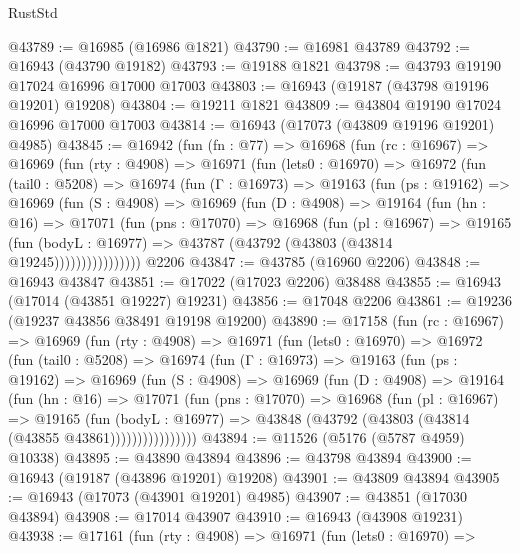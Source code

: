 \begin{lexlean}{RustStd}
\begin{coremodule}
@43789 := @16985 (@16986 @1821)
@43790 := @16981 @43789
@43792 := @16943 (@43790 @19182)
@43793 := @19188 @1821
@43798 := @43793 @19190 @17024 @16996 @17000 @17003
@43803 := @16943 (@19187 (@43798 @19196 @19201) @19208)
@43804 := @19211 @1821
@43809 := @43804 @19190 @17024 @16996 @17000 @17003
@43814 := @16943 (@17073 (@43809 @19196 @19201) @4985)
@43845 := @16942
    (fun (fn : @77) =>
    @16968
      (fun (rc : @16967) =>
      @16969
        (fun (rty : @4908) =>
        @16971
          (fun (lets0 : @16970) =>
          @16972
            (fun (tail0 : @5208) =>
            @16974
              (fun (Γ : @16973) =>
              @19163
                (fun (ps : @19162) =>
                @16969
                  (fun (S : @4908) =>
                  @16969
                    (fun (D : @4908) =>
                    @19164
                      (fun (hn : @16) =>
                      @17071
                        (fun (pns : @17070) =>
                        @16968
                          (fun (pl : @16967) =>
                          @19165
                            (fun (bodyL : @16977) =>
                            @43787 (@43792 (@43803 (@43814 @19245))))))))))))))))
    @2206
@43847 := @43785 (@16960 @2206)
@43848 := @16943 @43847
@43851 := @17022 (@17023 @2206) @38488
@43855 := @16943 (@17014 (@43851 @19227) @19231)
@43856 := @17048 @2206
@43861 := @19236 (@19237 @43856 @38491 @19198 @19200)
@43890 := @17158
    (fun (rc : @16967) =>
    @16969
      (fun (rty : @4908) =>
      @16971
        (fun (lets0 : @16970) =>
        @16972
          (fun (tail0 : @5208) =>
          @16974
            (fun (Γ : @16973) =>
            @19163
              (fun (ps : @19162) =>
              @16969
                (fun (S : @4908) =>
                @16969
                  (fun (D : @4908) =>
                  @19164
                    (fun (hn : @16) =>
                    @17071
                      (fun (pns : @17070) =>
                      @16968
                        (fun (pl : @16967) =>
                        @19165
                          (fun (bodyL : @16977) =>
                          @43848 (@43792 (@43803 (@43814 (@43855 @43861))))))))))))))))
@43894 := @11526 (@5176 (@5787 @4959) @10338)
@43895 := @43890 @43894
@43896 := @43798 @43894
@43900 := @16943 (@19187 (@43896 @19201) @19208)
@43901 := @43809 @43894
@43905 := @16943 (@17073 (@43901 @19201) @4985)
@43907 := @43851 (@17030 @43894)
@43908 := @17014 @43907
@43910 := @16943 (@43908 @19231)
@43938 := @17161
    (fun (rty : @4908) =>
    @16971
      (fun (lets0 : @16970) =>

\end{coremodule}
\end{lexlean}
